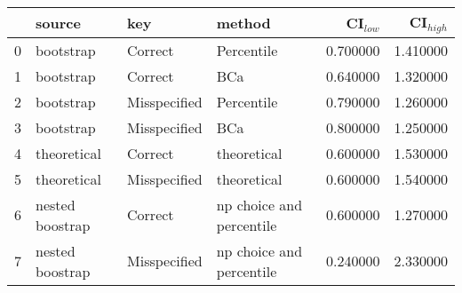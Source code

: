 \documentclass[a4paper,12pt]{article}
\theoremstyle{breaktheorem}
\theoremstyle{exerciseStyle}
\theoremstyle{solutionStyle}
\begin{document}
\begin{enumerate}
          \begin{tabular}{llllrr}
              \toprule
                & source          & key          & method                   & CI$_{low}$ & CI$_{high}$ \\
              \midrule
              0 & bootstrap       & Correct      & Percentile               & 0.700000   & 1.410000    \\
              1 & bootstrap       & Correct      & BCa                      & 0.640000   & 1.320000    \\
              2 & bootstrap       & Misspecified & Percentile               & 0.790000   & 1.260000    \\
              3 & bootstrap       & Misspecified & BCa                      & 0.800000   & 1.250000    \\
              4 & theoretical     & Correct      & theoretical              & 0.600000   & 1.530000    \\
              5 & theoretical     & Misspecified & theoretical              & 0.600000   & 1.540000    \\
              6 & nested boostrap & Correct      & np choice and percentile & 0.600000   & 1.270000    \\
              7 & nested boostrap & Misspecified & np choice and percentile & 0.240000   & 2.330000    \\
              \bottomrule
          \end{tabular}



\end{enumerate}
\end{document}
